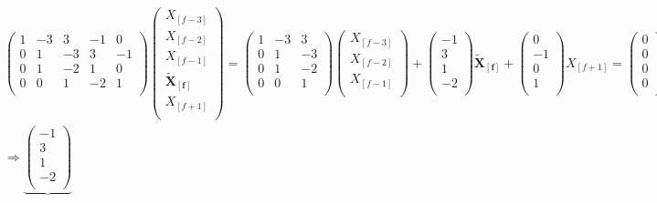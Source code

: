 \begin{equation}
\begin{split}
&\begin{pmatrix}
1 &-3 &3 &-1&0\\
0 &1 &-3 &3 &-1\\
0 &1 &-2 &1 &0\\
0 &0 &1 &-2 &1\\
\end{pmatrix}
\begin{pmatrix}
X_{[f-3]}\\
X_{[f-2]}\\
X_{[f-1]}\\
\boldsymbol{\tilde{X}_{[f]}}\\
X_{[f+1]}\\
\end{pmatrix} =
\begin{pmatrix}
1 &-3 &3\\
0 &1 &-3\\
0 &1 &-2\\
0 &0 &1\\
\end{pmatrix}
\begin{pmatrix}
X_{[f-3]}\\
X_{[f-2]}\\
X_{[f-1]}\\
\end{pmatrix}+
\begin{pmatrix}
-1\\
3\\
1\\
-2\\
\end{pmatrix}
\boldsymbol{\tilde{X}_{[f]}}+
\begin{pmatrix}
0\\
-1\\
0\\
1\\
\end{pmatrix}
X_{[f+1]} = 
\begin{pmatrix}
0\\
0\\
0\\
0\\
\end{pmatrix} \\
&\Rightarrow
\underbrace{
\begin{pmatrix}
-1\\
3\\
1\\
-2\\

\end{pmatrix}}
\end{split}
\end{equation}
